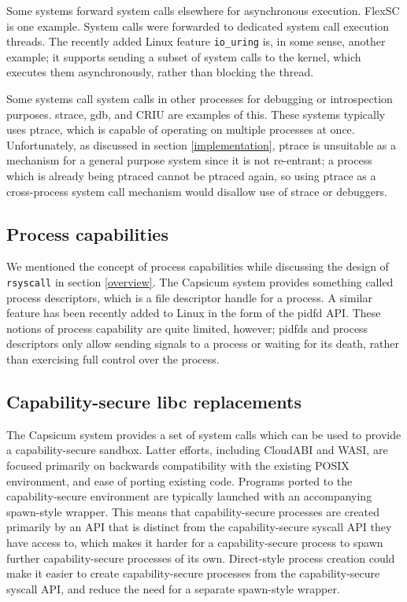\documentclass[sigplan]{acmart}
\begin{document}
Some systems forward system calls elsewhere for asynchronous execution.
FlexSC\cite{flexsc} is one example.
System calls were forwarded to dedicated system call execution threads.
The recently added Linux feature \verb|io_uring| is, in some sense, another example;
it supports sending a subset of system calls to the kernel,
which executes them asynchronously,
rather than blocking the thread.

Some systems call system calls in other processes for debugging or introspection purposes.
strace, gdb, and CRIU\cite{criu} are examples of this.
These systems typically uses ptrace,
which is capable of operating on multiple processes at once.
Unfortunately, as discussed in section \ref{implementation},
ptrace is unsuitable as a mechanism for a general purpose system since it is not re-entrant;
a process which is already being ptraced cannot be ptraced again,
so using ptrace as a cross-process system call mechanism would disallow use of strace or debuggers.
\subsection{Process capabilities}
We mentioned the concept of process capabilities while discussing the design of \texttt{rsyscall} in section \ref{overview}.
The Capsicum system provides something called process descriptors\cite{capsicum},
which is a file descriptor handle for a process.
A similar feature has been recently added to Linux in the form of the pidfd API\cite{pidfd}.
These notions of process capability are quite limited, however;
pidfds and process descriptors only allow sending signals to a process or waiting for its death,
rather than exercising full control over the process.
\subsection{Capability-secure libc replacements}
The Capsicum system provides a set of system calls
which can be used to provide a capability-secure sandbox.\cite{capsicum}
Latter efforts\cite{oblivious}, including CloudABI\cite{cloudabi} and WASI\cite{wasi},
are focused primarily on backwards compatibility with the existing POSIX environment, and ease of porting existing code.
Programs ported to the capability-secure environment
are typically launched with an accompanying spawn-style wrapper.
This means that capability-secure processes are created primarily by an API
that is distinct from the capability-secure syscall API they have access to,
which makes it harder for a capability-secure process to spawn further capability-secure processes of its own.
Direct-style process creation could make it easier to create capability-secure processes 
from the capability-secure syscall API,
and reduce the need for a separate spawn-style wrapper.
\end{document}
